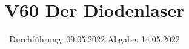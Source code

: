 

\subject{Fortgeschrittenenpraktikum}
\title{V60 Der Diodenlaser}
\date{%
  Durchführung: 09.05.2022
  \hspace{3em}
  Abgabe: 14.05.2022
}



\maketitle
\thispagestyle{empty}
\tableofcontents
\newpage






%

\printbibliography{}




